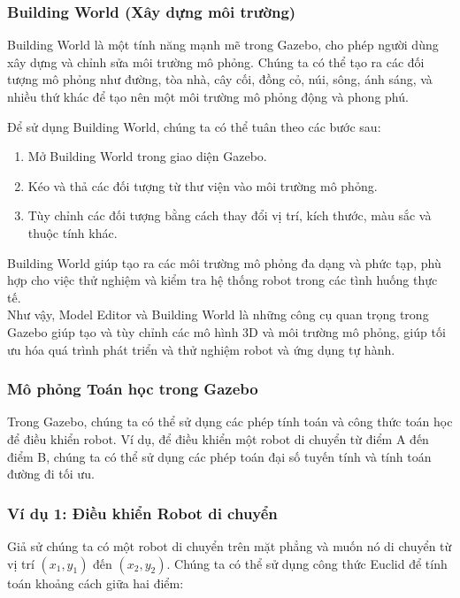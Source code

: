 \subsubsection*{Building World (Xây dựng môi trường)}

Building World là một tính năng mạnh mẽ trong Gazebo, cho phép người dùng xây dựng và chỉnh sửa môi trường mô phỏng. Chúng ta có thể tạo ra các đối tượng mô phỏng như đường, tòa nhà, cây cối, đồng cỏ, núi, sông, ánh sáng, và nhiều thứ khác để tạo nên một môi trường mô phỏng động và phong phú.

Để sử dụng Building World, chúng ta có thể tuân theo các bước sau:

\begin{enumerate}
    \item Mở Building World trong giao diện Gazebo.
    \item Kéo và thả các đối tượng từ thư viện vào môi trường mô phỏng.
    \item Tùy chỉnh các đối tượng bằng cách thay đổi vị trí, kích thước, màu sắc và thuộc tính khác.
\end{enumerate}

\noindent Building World giúp tạo ra các môi trường mô phỏng đa dạng và phức tạp, phù hợp cho việc thử nghiệm và kiểm tra hệ thống robot trong các tình huống thực tế.\\

\noindent Như vậy, Model Editor và Building World là những công cụ quan trọng trong Gazebo giúp tạo và tùy chỉnh các mô hình 3D và môi trường mô phỏng, giúp tối ưu hóa quá trình phát triển và thử nghiệm robot và ứng dụng tự hành. 


\subsubsection{Mô phỏng Toán học trong Gazebo}

Trong Gazebo, chúng ta có thể sử dụng các phép tính toán và công thức toán học để điều khiển robot. Ví dụ, để điều khiển một robot di chuyển từ điểm A đến điểm B, chúng ta có thể sử dụng các phép toán đại số tuyến tính và tính toán đường đi tối ưu.

\subsubsection*{Ví dụ 1: Điều khiển Robot di chuyển}

Giả sử chúng ta có một robot di chuyển trên mặt phẳng và muốn nó di chuyển từ vị trí $(x_1, y_1)$ đến $(x_2, y_2)$. Chúng ta có thể sử dụng công thức Euclid để tính toán khoảng cách giữa hai điểm:

